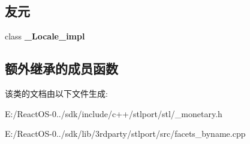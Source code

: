 \subsection*{友元}
\begin{DoxyCompactItemize}
\item 
\mbox{\label{classmoneypunct__byname_3_01wchar__t_00_01false_01_4_ae9c09ac7cd16ad35f8fdb1587ac77eb8}} 
class {\bfseries \+\_\+\+Locale\+\_\+impl}
\end{DoxyCompactItemize}
\subsection*{额外继承的成员函数}


该类的文档由以下文件生成\+:\begin{DoxyCompactItemize}
\item 
E\+:/\+React\+O\+S-\/0../sdk/include/c++/stlport/stl/\+\_\+monetary.\+h\item 
E\+:/\+React\+O\+S-\/0../sdk/lib/3rdparty/stlport/src/facets\+\_\+byname.\+cpp\end{DoxyCompactItemize}
